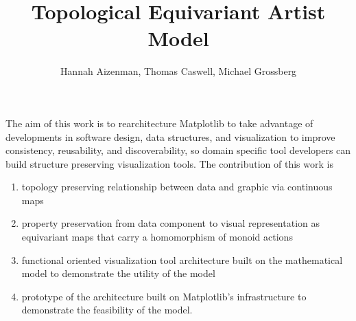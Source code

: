 \documentclass[journal]{vgtc}                %
\title{Topological Equivariant Artist Model}
\author{Hannah Aizenman, Thomas Caswell, Michael Grossberg}
\begin{document}
\linenumbers %

\maketitle
The aim of this work is to rearchitecture Matplotlib to take advantage of developments in software design, data structures, and visualization to improve consistency, reusability, and discoverability, so domain specific tool developers can build structure preserving visualization tools. The contribution of this work is 
\begin{enumerate}
  \item topology preserving relationship between data and graphic via continuous maps
  \item property preservation from data component to visual representation as equivariant maps that carry a homomorphism of monoid actions
  \item functional oriented visualization tool architecture built on the mathematical model to demonstrate the utility of the model
  \item prototype of the architecture built on Matplotlib's infrastructure to demonstrate the feasibility of the model.
\end{enumerate}
\end{document}
